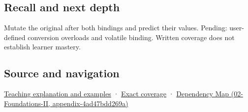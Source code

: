 \subsection{Recall and next depth}\label{appendix-37856d997bb0-recall-and-next-depth}

Mutate the original after both bindings and predict their values. Pending: user-defined conversion overloads and volatile binding. Written coverage does not establish learner mastery.

\subsection{Source and navigation}\label{appendix-37856d997bb0-source-and-navigation}

\hyperref[01-foundations-i-ch003-binding-chooses-a-referent-not-always-the-one-you-imagined]{Teaching explanation and examples} · \hyperref[appendix-fd090d982a15-m008---parts-113-126]{Exact coverage} · \href{../02-Foundations-II/main.pdf\#nameddest=appendix-4ad47bdd269a}{Dependency Map (02-Foundations-II, appendix-4ad47bdd269a)}
